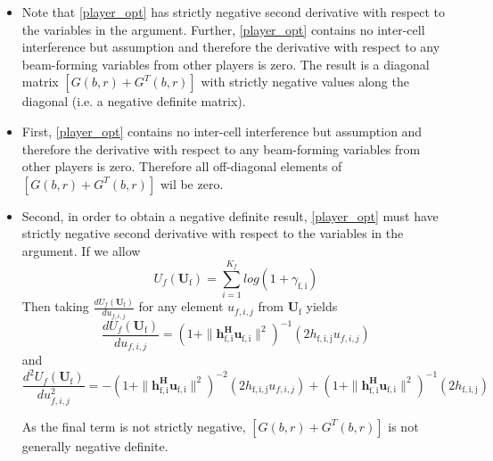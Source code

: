 \documentclass[12pt]{article}
\begin{document}
\begin{enumerate}
\begin{itemize}
\item 
Note that \eqref{player_opt} has strictly negative second derivative with respect to the variables in the argument. Further, \eqref{player_opt} contains no inter-cell interference but assumption and therefore the derivative with respect to any beam-forming variables from other players is zero. The result is a diagonal matrix $[G(b,r)+G^{T}(b,r)] $ with strictly negative values along the diagonal (i.e. a negative definite matrix). 
\item First, \eqref{player_opt} contains no inter-cell interference but assumption and therefore the derivative with respect to any beam-forming variables from other players is zero. Therefore all off-diagonal elements of $[G(b,r)+G^{T}(b,r)] $ wil be zero.
\item Second, in order to obtain a negative definite result, \eqref{player_opt} must have strictly negative second derivative with respect to the variables in the argument. If we allow
\begin{equation*}
	U_f(\mathbf{U}_\mathrm{f}) = \sum^{K_f}_{i=1} log(1+\gamma_{\mathrm{f,i}})
\end{equation*}
Then taking $\frac{dU_f(\mathbf{U}_\mathrm{f})}{du_{f,i,j}}$  for any element $u_{f,i,j}$ from $\mathbf{U}_\mathrm{f}$ yields
\begin{equation*}
	\frac{dU_f(\mathbf{U}_\mathrm{f})}{du_{f,i,j}}= 
	(1+\|\mathbf{h^H_{\mathrm{f,i}}u_{\mathrm{f,i}}}\|^2)^{-1} 
	(2h_{\mathrm{f,i,j}}u_{f,i,j})
\end{equation*}
and 
\begin{equation*}
	\frac{d^2U_f(\mathbf{U}_\mathrm{f})}{du^2_{f,i,j}}= 
	-(1+\|\mathbf{h^H_{\mathrm{f,i}}u_{\mathrm{f,i}}}\|^2)^{-2} 
	(2h_{\mathrm{f,i,j}}u_{f,i,j}) +
	(1+\|\mathbf{h^H_{\mathrm{f,i}}u_{\mathrm{f,i}}}\|^2)^{-1} 
	(2h_{\mathrm{f,i,j}})
\end{equation*}
 
As the final term is not strictly negative,  $[G(b,r)+G^{T}(b,r)] $ is not generally negative definite. 



\end{itemize}

\end{enumerate}
\end{document}
